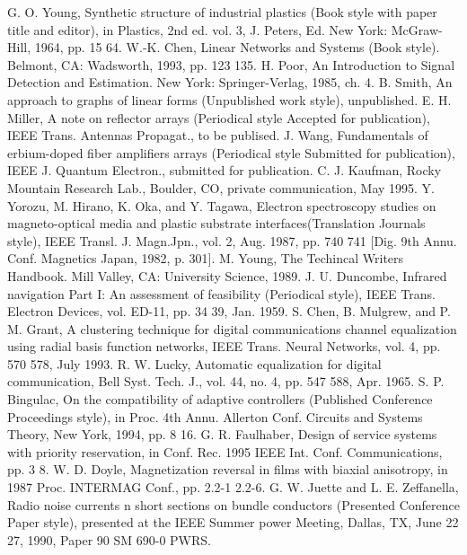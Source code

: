 \documentclass[a4paper, 10pt, conference]{ieeeconf}
\begin{document}
\begin{thebibliography}{99}

 G. O. Young, Synthetic structure of industrial plastics (Book style with paper title and editor), in Plastics, 2nd ed. vol. 3, J. Peters, Ed. New York: McGraw-Hill, 1964, pp. 15 64.
 W.-K. Chen, Linear Networks and Systems (Book style).	Belmont, CA: Wadsworth, 1993, pp. 123 135.
 H. Poor, An Introduction to Signal Detection and Estimation. New York: Springer-Verlag, 1985, ch. 4.
 B. Smith, An approach to graphs of linear forms (Unpublished work style), unpublished.
 E. H. Miller, A note on reflector arrays (Periodical style Accepted for publication), IEEE Trans. Antennas Propagat., to be publised.
 J. Wang, Fundamentals of erbium-doped fiber amplifiers arrays (Periodical style Submitted for publication), IEEE J. Quantum Electron., submitted for publication.
 C. J. Kaufman, Rocky Mountain Research Lab., Boulder, CO, private communication, May 1995.
 Y. Yorozu, M. Hirano, K. Oka, and Y. Tagawa, Electron spectroscopy studies on magneto-optical media and plastic substrate interfaces(Translation Journals style), IEEE Transl. J. Magn.Jpn., vol. 2, Aug. 1987, pp. 740 741 [Dig. 9th Annu. Conf. Magnetics Japan, 1982, p. 301].
 M. Young, The Techincal Writers Handbook. Mill Valley, CA: University Science, 1989.
 J. U. Duncombe, Infrared navigation Part I: An assessment of feasibility (Periodical style), IEEE Trans. Electron Devices, vol. ED-11, pp. 34 39, Jan. 1959.
 S. Chen, B. Mulgrew, and P. M. Grant, A clustering technique for digital communications channel equalization using radial basis function networks, IEEE Trans. Neural Networks, vol. 4, pp. 570 578, July 1993.
 R. W. Lucky, Automatic equalization for digital communication, Bell Syst. Tech. J., vol. 44, no. 4, pp. 547 588, Apr. 1965.
 S. P. Bingulac, On the compatibility of adaptive controllers (Published Conference Proceedings style), in Proc. 4th Annu. Allerton Conf. Circuits and Systems Theory, New York, 1994, pp. 8 16.
 G. R. Faulhaber, Design of service systems with priority reservation, in Conf. Rec. 1995 IEEE Int. Conf. Communications, pp. 3 8.
 W. D. Doyle, Magnetization reversal in films with biaxial anisotropy, in 1987 Proc. INTERMAG Conf., pp. 2.2-1 2.2-6.
 G. W. Juette and L. E. Zeffanella, Radio noise currents n short sections on bundle conductors (Presented Conference Paper style), presented at the IEEE Summer power Meeting, Dallas, TX, June 22 27, 1990, Paper 90 SM 690-0 PWRS.

\end{thebibliography}
\end{document}
